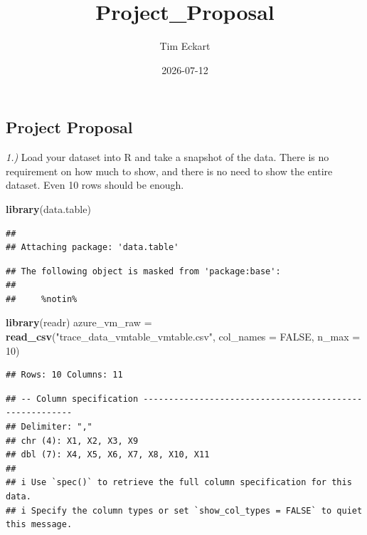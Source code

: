 \documentclass[
]{article}
\title{Project\_Proposal}
\author{Tim Eckart}
\date{2026-07-12}
\newenvironment{Shaded}{\begin{snugshade}}{\end{snugshade}}
\newcommand{\AttributeTok}[1]{\textcolor[rgb]{0.13,0.29,0.53}{#1}}
\newcommand{\ConstantTok}[1]{\textcolor[rgb]{0.56,0.35,0.01}{#1}}
\newcommand{\DecValTok}[1]{\textcolor[rgb]{0.00,0.00,0.81}{#1}}
\newcommand{\FunctionTok}[1]{\textcolor[rgb]{0.13,0.29,0.53}{\textbf{#1}}}
\newcommand{\NormalTok}[1]{#1}
\newcommand{\OtherTok}[1]{\textcolor[rgb]{0.56,0.35,0.01}{#1}}
\newcommand{\StringTok}[1]{\textcolor[rgb]{0.31,0.60,0.02}{#1}}
\begin{document}
\maketitle

{
\setcounter{tocdepth}{2}
\tableofcontents
}
\subsection{Project Proposal}\label{project-proposal}

\emph{1.)} Load your dataset into R and take a snapshot of the data.
There is no requirement on how much to show, and there is no need to
show the entire dataset. Even 10 rows should be enough.

\begin{Shaded}
\begin{Highlighting}[]
\FunctionTok{library}\NormalTok{(data.table)}
\end{Highlighting}
\end{Shaded}

\begin{verbatim}
## 
## Attaching package: 'data.table'
\end{verbatim}

\begin{verbatim}
## The following object is masked from 'package:base':
## 
##     %notin%
\end{verbatim}

\begin{Shaded}
\begin{Highlighting}[]
\FunctionTok{library}\NormalTok{(readr)}
\NormalTok{azure\_vm\_raw }\OtherTok{=} \FunctionTok{read\_csv}\NormalTok{(}\StringTok{"trace\_data\_vmtable\_vmtable.csv"}\NormalTok{, }\AttributeTok{col\_names =} \ConstantTok{FALSE}\NormalTok{, }\AttributeTok{n\_max =} \DecValTok{10}\NormalTok{) }
\end{Highlighting}
\end{Shaded}

\begin{verbatim}
## Rows: 10 Columns: 11
\end{verbatim}

\begin{verbatim}
## -- Column specification --------------------------------------------------------
## Delimiter: ","
## chr (4): X1, X2, X3, X9
## dbl (7): X4, X5, X6, X7, X8, X10, X11
## 
## i Use `spec()` to retrieve the full column specification for this data.
## i Specify the column types or set `show_col_types = FALSE` to quiet this message.
\end{verbatim}
\end{document}
